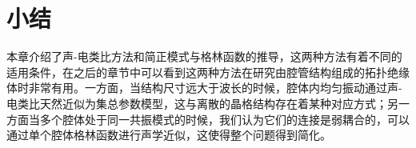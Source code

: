 \section{小结}
本章介绍了声-电类比方法和简正模式与格林函数的推导，这两种方法有着不同的适用条件，在之后的章节中可以看到这两种方法在研究由腔管结构组成的拓扑绝缘体时非常有用。一方面，当结构尺寸远大于波长的时候，腔体内均匀振动通过声-电类比天然近似为集总参数模型，这与离散的晶格结构存在着某种对应方式；另一方面当多个腔体处于同一共振模式的时候，我们认为它们的连接是弱耦合的，可以通过单个腔体格林函数进行声学近似，这使得整个问题得到简化。

